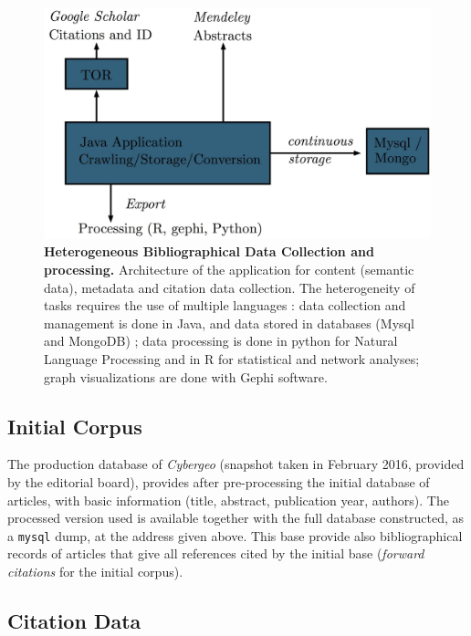 \documentclass[10pt]{article}
\begin{document}
\begin{figure}
\includegraphics[width=\linewidth]{Fig1.jpg}
\caption{\textbf{Heterogeneous Bibliographical Data Collection and processing.} Architecture of the application for content (semantic data), metadata and citation data collection. The heterogeneity of tasks requires the use of multiple languages : data collection and management is done in Java, and data stored in databases (Mysql and MongoDB) ; data processing is done in python for Natural Language Processing and in R for statistical and network analyses; graph visualizations are done with Gephi software.}
\label{fig:datacollection}
\end{figure}




\subsection*{Initial Corpus}

The production database of \textit{Cybergeo} (snapshot taken in February 2016, provided by the editorial board), provides after pre-processing the initial database of articles, with basic information (title, abstract, publication year, authors). The processed version used is available together with the full database constructed, as a \texttt{mysql} dump, at the address given above. This base provide also bibliographical records of articles that give all references cited by the initial base (\emph{forward citations} for the initial corpus).



\subsection*{Citation Data}
\end{document}
